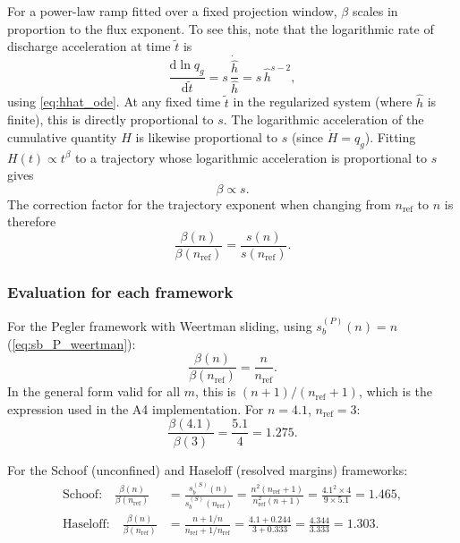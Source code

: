 \documentclass[11pt]{article}
\newcommand{\dd}{\mathrm{d}}
\newcommand{\qg}{q_g}
\newcommand{\hhat}{\hat{h}}
\newcommand{\tdim}{\tilde{t}}
\begin{document}
For a power-law ramp fitted over a fixed projection window, $\beta$ scales in proportion to the flux exponent. To see this, note that the logarithmic rate of discharge acceleration at time $\tdim$ is
\begin{equation}
	\frac{\dd\ln\qg}{\dd\tdim} = s\,\frac{\dot{\hhat}}{\hhat} = s\,\hhat^{s-2},
	\label{eq:log_accel}
\end{equation}
using \cref{eq:hhat_ode}. At any fixed time $\tdim$ in the regularized system (where $\hhat$ is finite), this is directly proportional to $s$. The logarithmic acceleration of the cumulative quantity $H$ is likewise proportional to $s$ (since $\dot{H} = \qg$). Fitting $H(t) \propto t^\beta$ to a trajectory whose logarithmic acceleration is proportional to $s$ gives
\begin{equation}
	\beta \propto s.
	\label{eq:beta_propto_s}
\end{equation}
The correction factor for the trajectory exponent when changing from $n_{\mathrm{ref}}$ to $n$ is therefore
\begin{equation}
	\boxed{\frac{\beta(n)}{\beta(n_{\mathrm{ref}})} = \frac{s(n)}{s(n_{\mathrm{ref}})}.}
	\label{eq:beta_correction}
\end{equation}

\subsubsection{Evaluation for each framework}

For the Pegler framework with Weertman sliding, using $s_b^{(P)}(n) = n$ (\cref{eq:sb_P_weertman}):
\begin{equation}
	\frac{\beta(n)}{\beta(n_{\mathrm{ref}})} = \frac{n}{n_{\mathrm{ref}}}.
	\label{eq:beta_pegler}
\end{equation}
In the general form valid for all $m$, this is $(n+1)/(n_{\mathrm{ref}}+1)$, which is the expression used in the A4 implementation. For $n = 4.1$, $n_{\mathrm{ref}} = 3$:
\begin{equation}
	\frac{\beta(4.1)}{\beta(3)} = \frac{5.1}{4} = 1.275.
\end{equation}

For the Schoof (unconfined) and Haseloff (resolved margins) frameworks:
\begin{align}
	\text{Schoof:} \quad \frac{\beta(n)}{\beta(n_{\mathrm{ref}})} &= \frac{s_b^{(S)}(n)}{s_b^{(S)}(n_{\mathrm{ref}})} = \frac{n^2(n_{\mathrm{ref}}+1)}{n_{\mathrm{ref}}^2(n+1)} = \frac{4.1^2 \times 4}{9 \times 5.1} = 1.465, \label{eq:beta_schoof} \\[6pt]
	\text{Haseloff:} \quad \frac{\beta(n)}{\beta(n_{\mathrm{ref}})} &= \frac{n + 1/n}{n_{\mathrm{ref}} + 1/n_{\mathrm{ref}}} = \frac{4.1 + 0.244}{3 + 0.333} = \frac{4.344}{3.333} = 1.303. \label{eq:beta_haseloff}
\end{align}
\end{document}

